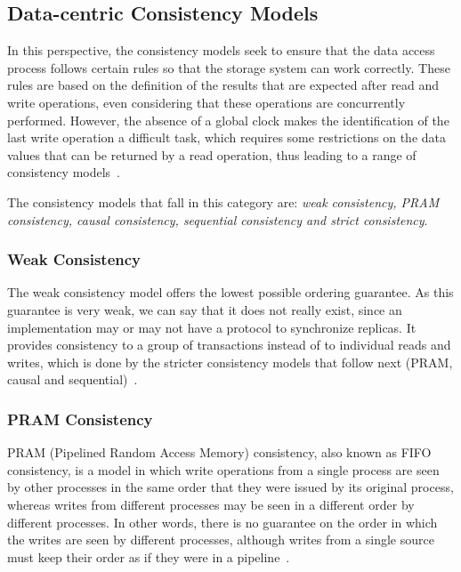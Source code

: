 \subsection{Data-centric Consistency Models}
In this perspective, the consistency models seek to ensure that the data access process follows certain rules so that the storage system can work correctly. These rules are based on the definition of the results that are expected after read and write operations, even considering that these operations are concurrently performed. However, the absence of a global clock makes {\al the identification} of the last write operation a difficult task, %
which requires some restrictions on the data values that can be returned by a read operation, thus leading to a range of consistency models~\cite{tanenbaum:2007}.

The {\al consistency models that fall in this category %
are:} \textit{weak consistency, PRAM consistency, causal consistency, sequential consistency and strict consistency}. 
\vspace{1mm}

\subsubsection{Weak Consistency}

The weak consistency model offers the lowest possible ordering guarantee. As this guarantee is very weak, 
we can say that
it does not really exist, since an implementation may or may not have a protocol to synchronize replicas. It provides consistency to a group of transactions instead of to individual reads and writes, which is done by {\dg the} stricter consistency models 
{\dg that follow next} (PRAM, causal and sequential)~\cite{tanenbaum:2007, Vogels:2009}. %
\vspace{1mm}

\subsubsection{PRAM Consistency}
 
PRAM (Pipelined Random Access Memory) consistency, also known as FIFO consistency, is a model in which write operations from a single process are seen by other processes in the same order that they were issued by its original process, whereas writes from different processes may be seen in a different order {\al by} different processes. In other words, there is no guarantee on the order in which the writes are seen by different processes, although writes from a single source must %
keep their order as if they were in a pipeline~\cite{lipton1988pram, tanenbaum:2007}.
\vspace{1mm}

